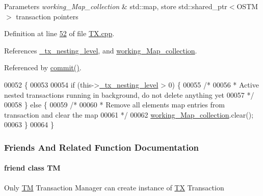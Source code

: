 \begin{DoxyParams}{Parameters}
{\em working\+\_\+\+Map\+\_\+collection} & std\+::map, store std\+::shared\+\_\+ptr$<$\+O\+S\+T\+M$>$ transaction pointers \\
\hline
\end{DoxyParams}


Definition at line \hyperlink{_t_x_8cpp_source_l00052}{52} of file \hyperlink{_t_x_8cpp_source}{T\+X.\+cpp}.



References \hyperlink{_t_x_8h_source_l00104}{\+\_\+tx\+\_\+nesting\+\_\+level}, and \hyperlink{_t_x_8h_source_l00094}{working\+\_\+\+Map\+\_\+collection}.



Referenced by \hyperlink{_t_x_8cpp_source_l00202}{commit()}.


\begin{DoxyCode}
00052                  \{
00053 
00054     \textcolor{keywordflow}{if} (this->\hyperlink{class_t_x_ae8f413fd7f4fea322e7ad3c668f9898e_ae8f413fd7f4fea322e7ad3c668f9898e}{\_tx\_nesting\_level} > 0) \{
00055         \textcolor{comment}{/*}
00056 \textcolor{comment}{         * Active nested transactions running in background, do not delete anything yet
}
00057 \textcolor{comment}{         */}
00058     \} \textcolor{keywordflow}{else} \{
00059         \textcolor{comment}{/* 
}
00060 \textcolor{comment}{         * Remove all elements map entries from transaction and clear the map
}
00061 \textcolor{comment}{         */}
00062         \hyperlink{class_t_x_a81aafda16e2f20e36ec6c68e584668ff_a81aafda16e2f20e36ec6c68e584668ff}{working\_Map\_collection}.clear();
00063     \}
00064 \}
\end{DoxyCode}


\subsubsection{Friends And Related Function Documentation}
\paragraph[{\texorpdfstring{TM}{TM}}]{\setlength{\rightskip}{0pt plus 5cm}friend class {\bf TM}\hspace{0.3cm}{\ttfamily [friend]}}\hypertarget{class_t_x_adf1ccda799ef5c419cb43b8ae55eb45c_adf1ccda799ef5c419cb43b8ae55eb45c}{}\label{class_t_x_adf1ccda799ef5c419cb43b8ae55eb45c_adf1ccda799ef5c419cb43b8ae55eb45c}
Only \hyperlink{class_t_m}{TM} Transaction Manager can create instance of \hyperlink{class_t_x}{TX} Transaction 


